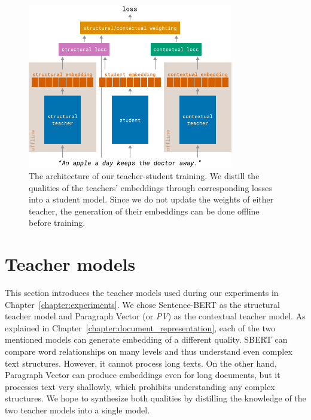 \begin{figure}
  \centering
  \includegraphics[width=0.8\textwidth]{./img/training_architecture.pdf}

  \caption{The architecture of our teacher-student training. We distill the
  qualities of the teachers' embeddings through corresponding losses into a
  student model. Since we do not update the weights of either teacher,
  the generation of their embeddings can be done offline before training.}

  \label{fig:teacher_student_train_arch}

\end{figure}

\section{Teacher models}\label{section:teacher_models}

This section introduces the teacher models used during our experiments in
Chapter~\ref{chapter:experiments}. We chose Sentence-BERT
\citep{reimers2019sentence} as the structural teacher model and Paragraph
Vector \citep{le2014distributed} (or \emph{PV}) as the contextual teacher model.
As explained in Chapter~\ref{chapter:document_representation}, each of the two
mentioned models can generate embedding of a different quality. SBERT can compare word relationships on many levels and thus understand even
complex text structures. However, it cannot process long texts. On the other
hand, Paragraph Vector can produce embeddings even for long documents, but it
processes text very shallowly, which prohibits understanding any complex
structures. We hope to synthesize both qualities by distilling the knowledge of the two
teacher models into a single model.

